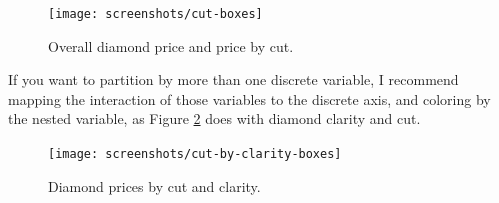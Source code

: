 \documentclass[12pt,]{isuthesis}
\newenvironment{Shaded}{\begin{snugshade}}{\end{snugshade}}
\newcommand{\KeywordTok}[1]{\textcolor[rgb]{0.13,0.29,0.53}{\textbf{{#1}}}}
\newcommand{\DataTypeTok}[1]{\textcolor[rgb]{0.13,0.29,0.53}{{#1}}}
\newcommand{\DecValTok}[1]{\textcolor[rgb]{0.00,0.00,0.81}{{#1}}}
\newcommand{\FloatTok}[1]{\textcolor[rgb]{0.00,0.00,0.81}{{#1}}}
\newcommand{\StringTok}[1]{\textcolor[rgb]{0.31,0.60,0.02}{{#1}}}
\newcommand{\OtherTok}[1]{\textcolor[rgb]{0.56,0.35,0.01}{{#1}}}
\newcommand{\NormalTok}[1]{{#1}}
\begin{document}
\begin{Shaded}
\end{Shaded}

\begin{figure}
\centering
\texttt{[image: screenshots/cut-boxes]}
\caption{\label{fig:cut-boxes}Overall diamond price and price by cut.}
\end{figure}

If you want to partition by more than one discrete variable, I recommend
mapping the interaction of those variables to the discrete axis, and
coloring by the nested variable, as Figure
\ref{fig:cut-by-clarity-boxes} does with diamond clarity and cut.

\begin{Shaded}
\end{Shaded}

\begin{figure}
\centering
\texttt{[image: screenshots/cut-by-clarity-boxes]}
\caption{\label{fig:cut-by-clarity-boxes}Diamond prices by cut and clarity.}
\end{figure}
\end{document}
